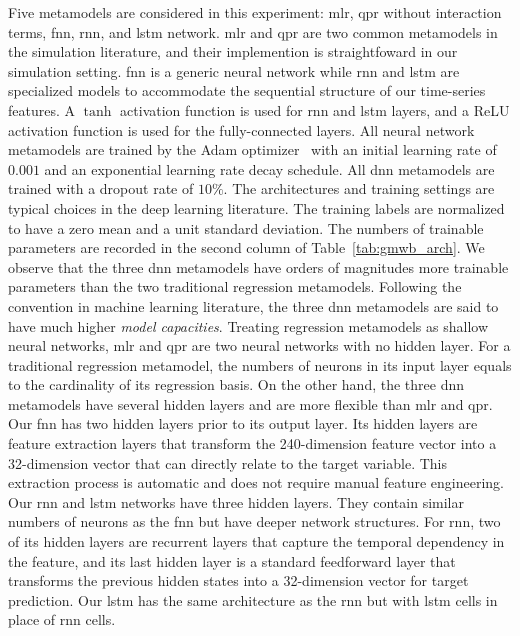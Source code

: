 Five metamodels are considered in this experiment: \gls{mlr}, \gls{qpr} without interaction terms, \gls{fnn}, \gls{rnn}, and \gls{lstm} network.
\gls{mlr} and \gls{qpr} are two common metamodels in the simulation literature, and their implemention is straightfoward in our simulation setting.
\gls{fnn} is a generic neural network while \gls{rnn} and \gls{lstm} are specialized models to accommodate the sequential structure of our time-series features.
A $\tanh$ activation function is used for \gls{rnn} and \gls{lstm} layers, and a ReLU activation function is used for the fully-connected layers.
All neural network metamodels are trained by the Adam optimizer~\citep{kingma2014adam} with an initial learning rate of $0.001$ and an exponential learning rate decay schedule.
All \gls{dnn} metamodels are trained with a dropout rate of $10\%$.
The architectures and training settings are typical choices in the deep learning literature.
The training labels are normalized to have a zero mean and a unit standard deviation.
The numbers of trainable parameters are recorded in the second column of Table~\ref{tab:gmwb_arch}.
We observe that the three \gls{dnn} metamodels have orders of magnitudes more trainable parameters than the two traditional regression metamodels.
Following the convention in machine learning literature, the three \gls{dnn} metamodels are said to have much higher \textit{model capacities}.
Treating regression metamodels as shallow neural networks, \gls{mlr} and \gls{qpr} are two neural networks with no hidden layer. 
For a traditional regression metamodel, the numbers of neurons in its input layer equals to the cardinality of its regression basis.
On the other hand, the three \gls{dnn} metamodels have several hidden layers and are more flexible than \gls{mlr} and \gls{qpr}.
Our \gls{fnn} has two hidden layers prior to its output layer.
Its hidden layers are feature extraction layers that transform the 240-dimension feature vector into a 32-dimension vector that can directly relate to the target variable.
This extraction process is automatic and does not require manual feature engineering.
Our \gls{rnn} and \gls{lstm} networks have three hidden layers.
They contain similar numbers of neurons as the \gls{fnn} but have deeper network structures.
For \gls{rnn}, two of its hidden layers are recurrent layers that capture the temporal dependency in the feature, and its last hidden layer is a standard feedforward layer that transforms the previous hidden states into a 32-dimension vector for target prediction.
Our \gls{lstm} has the same architecture as the \gls{rnn} but with \gls{lstm} cells in place of \gls{rnn} cells.

